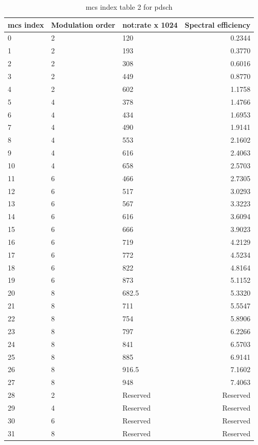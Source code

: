 \begin{table}[htb]
\centering
\caption{\gls{mcs} index table 2 for \gls{pdsch}}
\label{tab:mcs-table}
\begin{tabularx}{0.95\columnwidth}{l X X r}
  \toprule
  \gls{mcs} index  & Modulation order & \gls{not:rate} x 1024  &  Spectral efficiency \\
  \midrule
  0  &  2   & 120       &  0.2344 \\
  1  &  2   & 193       &  0.3770 \\
  2  &  2   & 308       &  0.6016 \\
  3  &  2   & 449       &  0.8770 \\
  4  &  2   & 602       &  1.1758 \\
  5  &  4   & 378       &  1.4766 \\
  6  &  4   & 434       &  1.6953 \\
  7  &  4   & 490       &  1.9141 \\
  8  &  4   & 553       &  2.1602 \\
  9  &  4   & 616       &  2.4063 \\
  10 &  4   & 658       &  2.5703 \\
  11 &  6   & 466       &  2.7305 \\
  12 &  6   & 517       &  3.0293 \\
  13 &  6   & 567       &  3.3223 \\
  14 &  6   & 616       &  3.6094 \\
  15 &  6   & 666       &  3.9023 \\
  16 &  6   & 719       &  4.2129 \\
  17 &  6   & 772       &  4.5234 \\
  18 &  6   & 822       &  4.8164 \\
  19 &  6   & 873       &  5.1152 \\
  20 &  8   & 682.5     &  5.3320 \\
  21 &  8   & 711       &  5.5547 \\
  22 &  8   & 754       &  5.8906 \\
  23 &  8   & 797       &  6.2266 \\
  24 &  8   & 841       &  6.5703 \\
  25 &  8   & 885       &  6.9141 \\
  26 &  8   & 916.5     &  7.1602 \\
  27 &  8   & 948       &  7.4063 \\
  28 &  2   & Reserved  & Reserved \\
  29 &  4   & Reserved  & Reserved \\
  30 &  6   & Reserved  & Reserved \\
  31 &  8   & Reserved  & Reserved \\
  \bottomrule
\end{tabularx}
\end{table}

